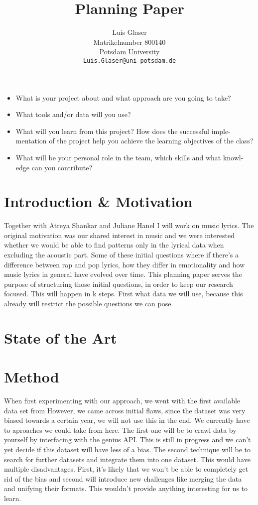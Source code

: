 \documentclass[11pt,a4paper]{article}
\title{Planning Paper}
\author{Luis Glaser\\
  Matrikelnumber 800140 \\
  Potsdam University \\
  {\tt Luis.Glaser@uni-potsdam.de}
  \\}
\date{}
\begin{document}
\maketitle
\begin{itemize}
\item What is your project about and what approach are you going to take?
\item What tools and/or data will you use?
\item What will you learn from this project? How does the successful imple- mentation of the project help you achieve the learning objectives of the class?
\item What will be your personal role in the team, which skills and what knowl- edge can you contribute?
\end{itemize}


\section{Introduction \& Motivation}

Together with Atreya Shankar and Juliane Hanel I will work on music lyrics. The original motivation was our shared interest in music and we were interested whether we would be able to find patterns only in the lyrical data when excluding the acoustic part. Some of these initial questions where if there's a difference between rap and pop lyrics, how they differ in emotionality and how music lyrics in general have evolved over time. 
This planning paper serves the purpose of structuring those initial questions, in order to keep our research focused. This will happen in k%
 steps. First what data we will use, because this already will restrict the possible questions we can pose. 

\section{State of the Art}

\section{Method}
When first experimenting with our approach, we went with the first available data set from %
However, we came across initial flaws, since the dataset was very biased towards a certain year, we will not use this in the end. We currently have to aproaches we could take from here. The first one will be to crawl data by yourself by interfacing with the genius API.%
This is still in progress and we can't yet decide if this dataset will have less of a bias. The second technique will be to search for further datasets and integrate them into one dataset. This would have multiple disadvantages. First, it's likely that we won't be able to completely get rid of the bias and second will introduce new challenges like merging the data and unifying their formats. This wouldn't provide anything interesting for us to learn. 
\end{document}
